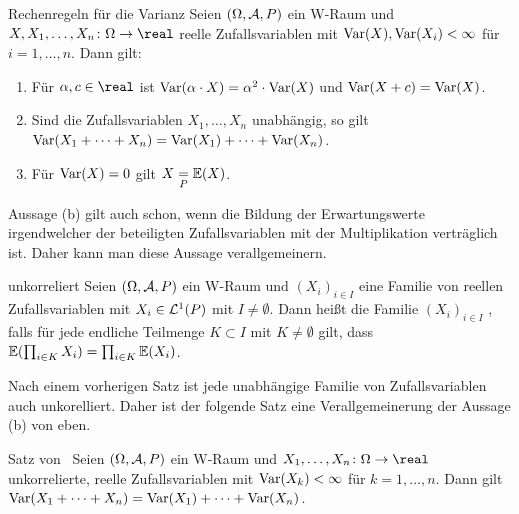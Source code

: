 \begin{Satz}{Rechenregeln für die Varianz}
    Seien $(\Omega, \mathcal{A}, P)$ ein W-Raum und $X, X_1, \dotsc, X_n\colon \Omega \rightarrow \real$
    reelle Zufallsvariablen mit $\text{Var}(X), \text{Var}(X_i) < \infty$ für $i = 1, \dotsc, n$.
    Dann gilt:
    \begin{enumerate}
        \item
        Für $\alpha, c \in \real$ ist $\text{Var}(\alpha \cdot X) = \alpha^2 \cdot \text{Var}(X)$ und
        $\text{Var}(X + c) = \text{Var}(X)$.
        
        \item
        Sind die Zufallsvariablen $X_1, \dotsc, X_n$ unabhängig, so gilt\\
        $\text{Var}(X_1 + \dotsb + X_n) = \text{Var}(X_1) + \dotsb + \text{Var}(X_n)$.
        
        \item
        Für $\text{Var}(X) = 0$ gilt $X \underset{P}{=} \mathbb{E}(X)$.
    \end{enumerate}
\end{Satz}

\linie
\pagebreak

\begin{Bem}
    Aussage (b) gilt auch schon, wenn die Bildung der Erwartungswerte irgendwelcher der beteiligten
    Zufallsvariablen mit der Multiplikation verträglich ist.
    Daher kann man diese Aussage verallgemeinern.
\end{Bem}

\begin{Def}{unkorreliert}
    Seien $(\Omega, \mathcal{A}, P)$ ein W-Raum und $(X_i)_{i \in I}$ eine Familie von
    reellen Zufallsvariablen mit $X_i \in \mathcal{L}^1(P)$ mit $I \not= \emptyset$.
    Dann heißt die Familie $(X_i)_{i \in I}$ , falls für jede
    endliche Teilmenge $K \subset I$ mit $K \not= \emptyset$ gilt, dass
    $\mathbb{E}(\prod_{i \in K} X_i) = \prod_{i \in K} \mathbb{E}(X_i)$.
\end{Def}

\begin{Bem}
    Nach einem vorherigen Satz ist jede unabhängige Familie von Zufallsvariablen auch
    unkorelliert.
    Daher ist der folgende Satz eine Verallgemeinerung der Aussage (b) von eben.
\end{Bem}

\begin{Satz}{Satz von \upshape\,\!}
    Seien $(\Omega, \mathcal{A}, P)$ ein W-Raum und $X_1, \dotsc, X_n\colon \Omega \rightarrow \real$
    unkorrelierte, reelle Zufallsvariablen mit $\text{Var}(X_k) < \infty$ für $k = 1, \dotsc, n$.
    Dann gilt $\text{Var}(X_1 + \dotsb + X_n) = \text{Var}(X_1) + \dotsb + \text{Var}(X_n)$.
\end{Satz}

